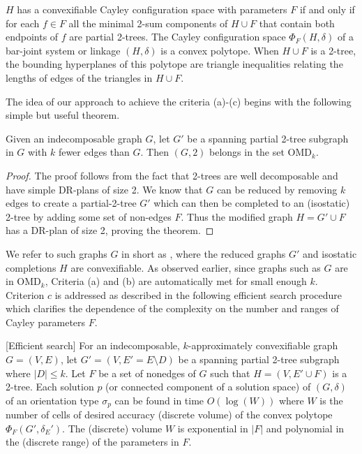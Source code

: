 \begin{theorem}\label{theorem:convexcayley}
    \uncited $H$ has a convexifiable Cayley configuration space  with
    parameters $F$ if and only if for each $f\in F$  all the minimal
    2-sum components of $H\cup F$ that contain both endpoints of $f$
    are partial 2-trees. The Cayley configuration space
    $\Phi_F(H,\delta)$ of a bar-joint system or linkage $(H,\delta)$
    is a convex polytope. When $H\cup F$ is a 2-tree, the bounding
    hyperplanes of this polytope are triangle inequalities relating
    the lengths of edges of the triangles in $H\cup F$.
\end{theorem}

The idea of our approach to achieve the criteria (a)-(c) begins with
the following simple but useful theorem.

\begin{theorem}\label{theorem:omdk}
    Given an indecomposable graph $G$, let $G'$ be a spanning partial
    2-tree subgraph in $G$ with $k$ fewer edges than $G$. Then
    $(G,2)$ belongs in the set OMD$_k$.
\end{theorem}

\begin{proof}
The proof follows from the fact that 2-trees are well decomposable and
have simple DR-plans of size 2. We know that $G$ can be reduced by
removing $k$ edges to create a partial-2-tree $G'$ which can then be
completed to an (isostatic) 2-tree by adding some set of non-edges
$F$. Thus the modified graph $H = G'\cup F$ has  a DR-plan of size 2,
proving the theorem.
\end{proof}

We refer to such graphs $G$ in short as , where the reduced graphs $G'$ and isostatic
completions $H$ are convexifiable. As observed earlier, since graphs
such as $G$ are in OMD$_k$, Criteria (a) and (b) are automatically met
for small enough $k$. Criterion $c$ is addressed as described in the
following efficient search procedure which clarifies the dependence of
the complexity on the number and ranges  of Cayley parameters $F$.

\begin{theorem}\label{theorem:criterionc}
    [Efficient search]
    For an indecomposable, $k$-approximately convexifiable graph $G =
    (V,E)$, let $G' = (V,E' =E\setminus D)$ be a spanning partial
    2-tree subgraph where $|D| \le  k$. Let  $F$ be a set of nonedges
    of $G$ such that $H = (V, E'\cup F)$ is a 2-tree. Each solution
    $p$ (or connected component of a solution space) of $(G,\delta)$
    of an orientation type $\sigma_p$ can be found in time
    $O(\log(W))$ where $W$ is the number of cells of desired accuracy
    (discrete volume) of the convex polytope $\Phi_F(G',\delta_E')$.
    The (discrete) volume $W$ is exponential in $|F|$ and polynomial
    in the (discrete range) of the parameters in $F$.
\end{theorem}

